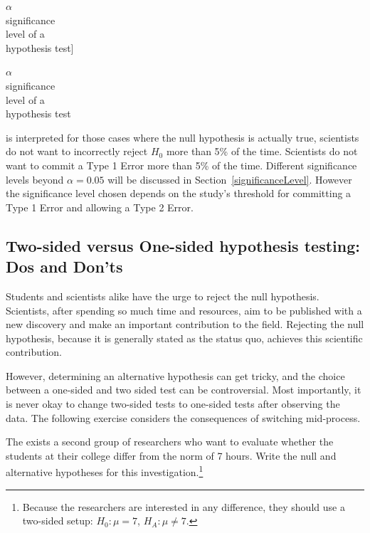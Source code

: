 $\alpha$\\\footnotesize significance\\level of a\\hypothesis test]{\raggedright\vspace{-4mm}

$\alpha$\\\footnotesize significance\\level of a\\hypothesis test} is interpreted for those cases where the null hypothesis is actually true, scientists do not want to incorrectly reject $H_0$ more than 5\% of the time. Scientists do not want to commit a Type 1 Error more than 5\% of the time. Different significance levels beyond $\alpha = 0.05$ will be discussed in Section~\ref{significanceLevel}. However the significance level chosen depends on the study's threshold for committing a Type 1 Error and allowing a Type 2 Error. 

\subsection{Two-sided versus One-sided hypothesis testing: Dos and Don'ts}
\label{twoSidedTestsWithPValues}


Students and scientists alike have the urge to reject the null hypothesis. Scientists, after spending so much time and resources, aim to be published with a new discovery and make an important contribution to the field. Rejecting the null hypothesis, because it is generally stated as the status quo, achieves this scientific contribution. 

However, determining an alternative hypothesis can get tricky, and the choice between a one-sided and two sided test can be controversial. Most importantly, it is never okay to change two-sided tests to one-sided tests after observing the data. The following exercise considers the consequences of switching mid-process.

\begin{exercise} \label{2ndSchSleepHypSetupExercise}
The exists a second group of researchers who want to evaluate whether the students at their college differ from the norm of 7 hours. Write the null and alternative hypotheses for this investigation.\footnote{Because the researchers are interested in any difference, they should use a two-sided setup: $H_0: \mu = 7$, $H_A: \mu \neq 7$.}
\end{exercise}

